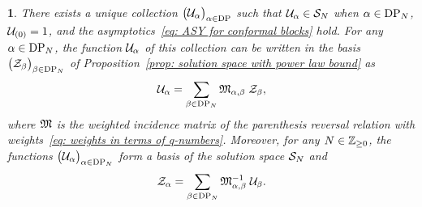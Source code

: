 \documentclass[oneside,english]{amsart}
\numberwithin{equation}{section}
\numberwithin{figure}{section}
\theoremstyle{plain}
\theoremstyle{plain}
\newtheorem{thm}{\protect\theoremname}%
\theoremstyle{plain}
\theoremstyle{remark}
\theoremstyle{plain}
\theoremstyle{plain}
\theoremstyle{plain}
\theoremstyle{plain}
\theoremstyle{plain}
\theoremstyle{plain}
\theoremstyle{plain}
\theoremstyle{plain}
\providecommand{\theoremname}{Theorem}
\newcommand{\blue}[1]{{\color{blue} #1}}
\begin{document}
\begin{thm}\label{thm: change of basis theorem}
There exists a unique collection $\big(\mathcal{U}_\alpha \big)_{\alpha \in \mathrm{DP}}$ %
such that $\mathcal{U}_\alpha \in \mathcal{S}_N$ when $\alpha \in \mathrm{DP}_N$,
$\mathcal{U}_{(0)} = 1$, and 
the asymptotics~\eqref{eq: ASY for conformal blocks} hold. %
For any $\alpha \in \mathrm{DP}_N$, the function $\mathcal{U}_\alpha$ %
of this collection can be written in the basis $\big( \mathcal{Z}_\beta \big)_{\beta \in \mathrm{DP}_N}$ of
Proposition~\ref{prop: solution space with power law bound} as
\begin{align*}
\mathcal{U}_\alpha =
\sum_{\beta \in \mathrm{DP}_N} \mathfrak{M}_{\alpha,\beta}\; \mathcal{Z}_\beta,
\end{align*}
where $\mathfrak{M}$ is the weighted incidence matrix of the parenthesis reversal
relation with weights~\eqref{eq: weights in terms of q-numbers}.
Moreover, for any $N \in \mathbb{Z}_{\geq 0}$, the functions $\big( \mathcal{U}_\alpha \big)_{\alpha \in \mathrm{DP}_N}$
form a basis of the %
solution space $\mathcal{S}_N$ and
\begin{align*}
\mathcal{Z}_\alpha =
\sum_{\beta \in \mathrm{DP}_N} \mathfrak{M}^{-1}_{\alpha,\beta}\;\mathcal{U}_\beta .
\end{align*}
\end{thm}
\end{document}
